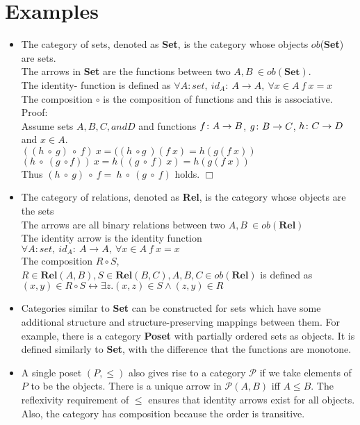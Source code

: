 \section {Examples}
\begin {itemize}

 \item The category of sets, denoted as \textbf{Set}, is the category whose objects $ob$(\textbf{Set}) are sets.
   \\ The arrows in \textbf{Set} are the functions between two $A,B\ \in ob(\textbf{Set}).$
   \\ The identity- function is defined as $\forall A: set, \ id_A:\ A \to A,\ \forall x \in A \ f \ x = x$
   \\ The composition $\circ$ is the composition of functions and this is associative. Proof:
   \\ Assume sets $A, B, C, and D$ and functions $f \from A \to B$, $g \from B \to C$, $h \from C \to D$ and $x \in A$.
   \\ $((h\ \circ \ g)\ \circ\ f)\ x = ((h \ \circ g \ )(f \ x) =h(g(f\  x)) $
   \\ $(h\ \circ \ (g \ \circ f))\ x = h ((g\ \circ \ f) \ x) = h(g(f \ x))$
   \\ Thus $(h\ \circ \ g)\ \circ \ f = \ h \ \circ \ (g \ \circ \ f)$ holds. $\Box$
 \item The category of relations, denoted as \textbf{Rel}, is the category whose objects are the sets
   \\The arrows are all binary relations between two $A,B \ \in ob(\textbf{Rel})$
   \\The identity arrow  is the identity function $\forall A: set, \ id_A:\ A \to A,\ \forall x \in A \ f \ x = x$
   \\ The composition $R \circ S$, $R  \in \textbf{Rel}(A,B), S \in \textbf{Rel}(B,C), A,B,C \in ob(\textbf{Rel})$ is defined as $ (x,y) \in  R \circ S \leftrightarrow \exists  z.(x,z) \in S \land (z,y) \in R$
   
  \item Categories similar to \textbf{Set} can be constructed for sets which have some additional structure and structure-preserving mappings between them. For example, there is a category \textbf{Poset} with partially ordered sets as objects. It is defined similarly to \textbf{Set}, with the difference that the functions are monotone. 
  
  \item A single poset $(P, \leq)$ also gives rise to a category $\mathscr{P}$ if we take elements of $P$ to be the objects. There is a unique arrow in $\mathscr{P}(A, B)$ iff $A \leq B$. The reflexivity requirement of $\leq$ ensures that identity arrows exist for all objects. Also, the category has composition because the order is transitive.
  

\end{itemize}
